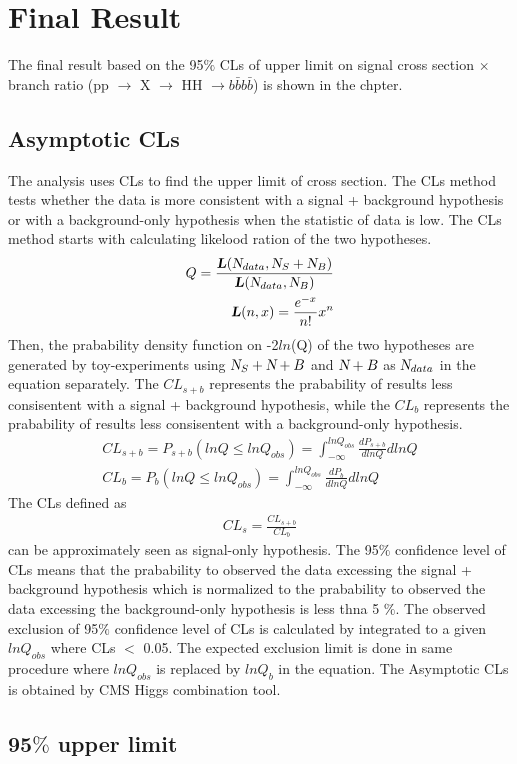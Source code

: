 \chapter{Final Result} \label{chap:6}

The final result based on the 95$\% $ CLs of upper limit on signal cross section $\times $ branch ratio (pp $\rightarrow$ X $\rightarrow$ HH $\rightarrow b\bar{b}b\bar{b}$) is shown in the chpter.

\section{Asymptotic CLs} 
The analysis uses CLs to find the upper limit of cross section\citep{0954-3899-28-10-313,NicolasChanon}. The CLs method tests whether the data is more consistent with a signal + background hypothesis or with a background-only hypothesis when the statistic of data is low. The CLs method starts with calculating likelood ration of the two hypotheses. 
\begin{equation} \label{eq1}
\begin{split}
Q = \frac{\textbf{\textsl{L}}(\textsl{N}_{data},\textsl{N}_{S}+\textsl{N}_{B})}{\textbf{\textsl{L}}(\textsl{N}_{data},\textsl{N}_{B})}\\
\textbf{\textsl{L}}(n,x) = \frac{e^{-x}}{n!}x^n
\end{split}
\end{equation}
Then, the prabability density function on -2$\textit{ln}$(Q) of the two hypotheses are generated by toy-experiments using $\textsl{N}_{S} + \textsl{N}+{B}$ and $\textsl{N}+{B}$ as $\textsl{N}_{data}$ in the equation separately. The $CL_{s+b}$ represents the prabability of results less consisentent with a signal + background hypothesis, while the $CL_{b}$ represents the prabability of results less consisentent with a background-only hypothesis.
\begin{equation} \label{eq1}
\begin{split}
CL_{s+b} = P_{s+b}(lnQ \leq lnQ_{obs}) = \int^{lnQ_{obs}}_{-\infty} \frac{dP_{s+b}}{dlnQ} dlnQ \\
CL_{b} = P_{b}(lnQ \leq lnQ_{obs}) = \int^{lnQ_{obs}}_{-\infty} \frac{dP_{b}}{dlnQ} dlnQ
\end{split}
\end{equation}
The CLs defined as 
\begin{equation} \label{eq1}
\begin{split}
CL_{s} = \frac{CL_{s+b}}{CL_{b}}
\end{split}
\end{equation}
can be approximately seen as signal-only hypothesis. The 95$\% $ confidence level of CLs means that the prabability to observed the data excessing the signal + background hypothesis which is normalized to the prabability to observed the data excessing the background-only hypothesis is less thna 5 $\% $. The observed  exclusion of 95$\% $ confidence level of CLs is calculated by integrated to a given $lnQ_{obs}$ where CLs $<$ 0.05. The expected exclusion limit is done in same procedure where $lnQ_{obs}$ is replaced by $lnQ_{b}$ in the equation. The Asymptotic CLs is obtained by CMS Higgs combination tool\citep{higgsCombine}.

\section{95$\% $ upper limit}
 